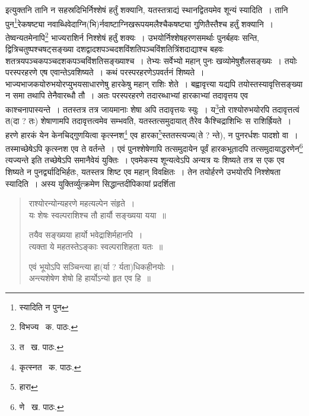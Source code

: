 \documentclass[11pt, openany]{book}
\begin{document}
\begin{sloppypar} 
\noindent इत्युक्तनि तानि न सहस्रदिभिर्निश्शेषं हर्तुं शक्यानि, यतस्तत्राद्यं स्थानद्वितयमेव शून्यं स्यादिति~। तानि पुन\renewcommand{\thefootnote}{१}\footnote{स्यादिति न पुन}रेकषष्ट्या नवाब्धिवेदाग्नि(भि)र्नवाष्टाग्निखरूपयमलैश्चैकषष्ट्या गुणितैस्तैश्च हर्तुं शक्यानि~। तेष्वन्यतमेनापि\renewcommand{\thefootnote}{२}\footnote{विभज्य \textendash\ क. पाठः.} भाज्यराशिर्न निश्शेषं हर्तुं शक्यः~। उभयोर्निश्शेषहरणसमर्थाः पुनर्बहवः सन्ति, द्वित्रिचतुष्पश्चषट्सङ्ख्या दशद्वादशपञ्चदशविंशतिपञ्चविंशतित्रिंशदाद्याश्च बहवः शतत्रयपञ्चकपञ्चदशकपञ्चविंशतिसङ्ख्याश्च~। तेभ्यः सर्वेभ्यो महान् पुनः खव्योमेषुशैलसङ्ख्यः~। तयोः परस्परहरणे एष एवान्तेऽवशिष्यते~। कथं परस्परहरणेऽपवर्तनं शिष्यते~। भाज्यभाजकयोरुभयोरप्युभयसाधारणेषु हारकेषु महान् राशिः शेते~। बह्वावृत्त्या यद्यपि तयोस्तस्यावृत्तिसङ्ख्या न समा तथापि तेनैवारब्धौ तौ~। अतः परस्परहरणे तदारब्धाभ्यां हारकाभ्यां तदावृत्तय एव काश्चनापास्यन्ते~। ततस्तत्र तत्र जायमानाः शेषा अपि तदावृत्तयः स्युः~। य\renewcommand{\thefootnote}{३}\footnote{त \textendash\ ख. पाठः.}तो राश्योरुभयोरपि तदावृत्तत्वं त(दा ? तः) शेषाणामपि तदावृत्तत्वमेव सम्भवति, यतस्तत्समुदायात् तैरेव कैश्चिद्राशिभिः स राशिर्ह्रियते~। हरणे हारकं येन केनचिद्गुणयित्वा कृत्स्नश\renewcommand{\thefootnote}{४}\footnote{कृत्स्नत \textendash\ क. पाठः.} एव हारका\renewcommand{\thefootnote}{५}\footnote{हारा}स्ततस्त्यज्य(ते ? न्ते), न पुनरर्धशः पादशो वा~। तस्माच्छेषेऽपि कृत्स्नश एव ते वर्तन्ते~। एवं पुनश्शेषेणापि तत्समुदायेन पूर्वं हारकभूतादपि तत्समुदायाद्धरणेन\renewcommand{\thefootnote}{६}\footnote{णे \textendash\ ख. पाठः.} त्यज्यन्ते इति तच्छेषेऽपि समानैवेयं युक्तिः~। एवमेकस्य शून्यत्वेऽपि अन्यत्र यः शिष्यते तत्र स एक एव शिष्यते न पुनर्द्व्यादिभिर्हतः, यतस्तत्र शिष्ट एव महान् विवक्षितः~। तेन तयोर्हरणे उभयोरपि निश्शेषता स्यादिति~। अस्य युक्तिर्व्युत्क्रमेण सिद्धान्तदीपिकायां प्रदर्शिता\textendash
\end{sloppypar}

\begin{quote}
{\qt राश्योरन्योन्यहरणे महत्यल्पेन संहृते~।\\
यः शेषः स्वल्पराशिश्च तौ हार्यौ सङ्ख्यया यया~॥

तयैव सङ्ख्यया हार्यो भवेद्राशिर्महानपि~।\\
त्यक्ता ये महतस्तेऽङ्काः स्वल्पराशिहता यतः~॥

एवं भूयोऽपि सञ्चिन्त्या हा(र्या ? र्यता)धिकहीनयोः~।\\
अन्त्यशेषेण शेषो हि हार्योऽन्यो हृत एव हि~॥}
\end{quote}

\newpage
\end{document}
